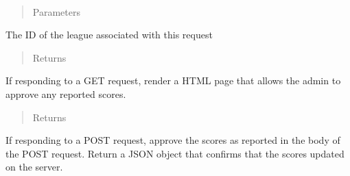 \documentclass[letterpaper,10pt,english]{sphinxmanual}
\begin{document}
\begin{fulllineitems}
\label{\detokenize{tiger_leagues/readme:tiger_leagues.admin.approve_scores}}~\begin{quote}\begin{description}
\item[{Parameters}] \leavevmode
{} \textendash{} 

\end{description}\end{quote}

The ID of the league associated with this request
\begin{quote}\begin{description}
\item[{Returns}] \leavevmode
{}

\end{description}\end{quote}

If responding to a GET request, render a HTML page that allows the admin to 
approve any reported scores.
\begin{quote}\begin{description}
\item[{Returns}] \leavevmode
{}

\end{description}\end{quote}

If responding to a POST request, approve the scores as reported in the body 
of the POST request. Return a JSON object that confirms that the scores 
updated on the server.

\end{fulllineitems}

\end{document}

